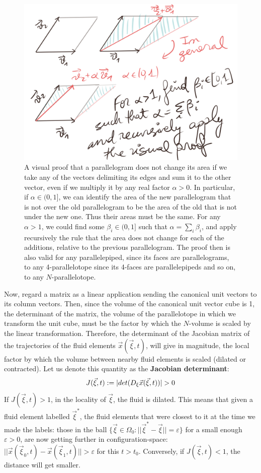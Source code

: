 \documentclass[11pt, a4paper]{article} %
\begin{document}
\begin{figure}[h!]
  \centering
    \includegraphics[width=0.63\linewidth]{10parallelepipid.png}
  \caption{ A visual proof that a parallelogram does not change its area if we take any of the vectors delimiting its edges  and sum it to the other vector, even if we multiply it by any real factor $\alpha> 0$. In particular, if $\alpha\in(0,1]$, we can identify the area of the new parallelogram that is not over the old parallelogram to be the area of the old that is not under the new one. Thus their areas must be the same. For any $\alpha>1$, we could find some $\beta_i\in(0,1]$ such that $\alpha=\sum_i\beta_i$, and apply recursively the rule that the area does not change for each of the additions, relative to the previous parallelogram. The proof then is also valid for any parallelepiped, since its faces are parallelograms, to any 4-parallelotope since its 4-faces are parallelepipeds and so on, to any $N$-parallelotope. \vspace{-0.1cm} }
  \label{fig:volumeDet}
\end{figure}
Now, regard a matrix as a linear application sending the canonical unit vectors to its column vectors. Then, since the volume of the canonical unit vector cube is 1, the determinant of the matrix, the volume of the parallelotope in which we transform the unit cube, must be the factor by which the $N$-volume is scaled by the linear transformation. Therefore, the determinant of the Jacobian matrix of the trajectories of the fluid elements $\vec{x}(\vec{\xi},t)$, will give in magnitude, the local factor by which the volume between nearby fluid elements is scaled (dilated or contracted). Let us denote this quantity as the {\bf Jacobian determinant}: \vspace{-0.2cm}
\begin{equation}
J(\vec{\xi},t):=|det (D_\xi \vec{x}(\vec{\xi},t))|>0 \vspace{-0.1cm}
\end{equation}
If $J(\vec{\xi},t)>1$, in the locality of $\vec{\xi}$, the fluid is dilated. This means that given a fluid element labelled $\vec{\xi}^*$, the fluid elements that were closest to it at the time we made the labels: those in the ball $\{\vec{\xi}\in\Omega_0:||\vec{\xi}^*-\vec{\xi}||=\varepsilon\}$ for a small enough $\varepsilon>0$, are now getting further in configuration-space: $||\vec{x}(\vec{\xi}_0,t)-\vec{x}(\vec{\xi}_1,t)||>\varepsilon$ for this $t>t_0$. Conversely, if $J(\vec{\xi},t)<1$, the distance will get smaller.
\end{document}
